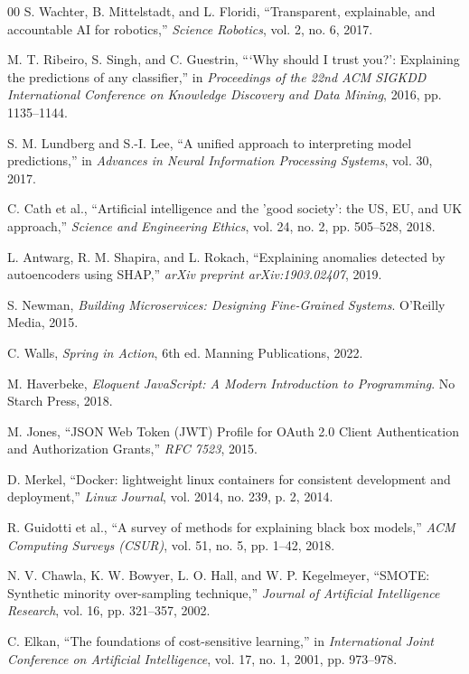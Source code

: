 \documentclass[conference]{IEEEtran}
\begin{document}
\begin{thebibliography}{00}
 S. Wachter, B. Mittelstadt, and L. Floridi, ``Transparent, explainable, and accountable AI for robotics,'' \textit{Science Robotics}, vol. 2, no. 6, 2017.

 M. T. Ribeiro, S. Singh, and C. Guestrin, ```Why should I trust you?': Explaining the predictions of any classifier,'' in \textit{Proceedings of the 22nd ACM SIGKDD International Conference on Knowledge Discovery and Data Mining}, 2016, pp. 1135--1144.

 S. M. Lundberg and S.-I. Lee, ``A unified approach to interpreting model predictions,'' in \textit{Advances in Neural Information Processing Systems}, vol. 30, 2017.

 C. Cath et al., ``Artificial intelligence and the 'good society': the US, EU, and UK approach,'' \textit{Science and Engineering Ethics}, vol. 24, no. 2, pp. 505--528, 2018.

 L. Antwarg, R. M. Shapira, and L. Rokach, ``Explaining anomalies detected by autoencoders using SHAP,'' \textit{arXiv preprint arXiv:1903.02407}, 2019.

 S. Newman, \textit{Building Microservices: Designing Fine-Grained Systems}. O'Reilly Media, 2015.

 C. Walls, \textit{Spring in Action}, 6th ed. Manning Publications, 2022.

 M. Haverbeke, \textit{Eloquent JavaScript: A Modern Introduction to Programming}. No Starch Press, 2018.

 M. Jones, ``JSON Web Token (JWT) Profile for OAuth 2.0 Client Authentication and Authorization Grants,'' \textit{RFC 7523}, 2015.

 D. Merkel, ``Docker: lightweight linux containers for consistent development and deployment,'' \textit{Linux Journal}, vol. 2014, no. 239, p. 2, 2014.

 R. Guidotti et al., ``A survey of methods for explaining black box models,'' \textit{ACM Computing Surveys (CSUR)}, vol. 51, no. 5, pp. 1--42, 2018.

 N. V. Chawla, K. W. Bowyer, L. O. Hall, and W. P. Kegelmeyer, ``SMOTE: Synthetic minority over-sampling technique,'' \textit{Journal of Artificial Intelligence Research}, vol. 16, pp. 321--357, 2002.

 C. Elkan, ``The foundations of cost-sensitive learning,'' in \textit{International Joint Conference on Artificial Intelligence}, vol. 17, no. 1, 2001, pp. 973--978.


\end{thebibliography}
\end{document}
